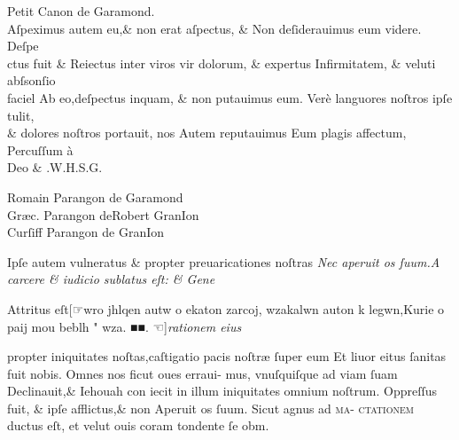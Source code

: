 \documentclass{article}
\newcommand{\threecolumntypefacenames}[3]{\begin{multicols}{3}
		\tiny
		\hfill \qquad \qquad \qquad \qquad #1\hspace*{\fill}\\
		\columnbreak
		\hfill #2\hspace*{\fill}\\
		\columnbreak
		\hfill #3\qquad \qquad \qquad \qquad \hspace*{\fill}
\end{multicols}}
\newcommand{\greektext}{\grecs wro jhlqen autw o ekaton zarcoj, wzakalwn auton k legwn,Kurie o paij mou beblh "\normalfont}
\begin{document}
{\small
\centering
Petit Canon de Garamond.\\
\vspace{-0.5\baselineskip}
\Large
\justifying
Aſpeximus autem eu,\& non erat aſpectus, \& Non deſiderauimus eum videre. Deſpe \\
ctus fuit \& Reiectus inter viros vir dolorum, \& expertus Infirmitatem, \& veluti abſsonſio \\
faciel Ab eo,deſpectus inquam, \& non putauimus eum. Ver\`e languores noſtros ipſe tulit, \\
\& dolores noſtros portauit, nos Autem reputauimus Eum plagis affectum, Percuſſum \`a\\
\centering
Deo \& .\quad  W.\quad H.\quad S.\quad G.\quad \\
\vspace{-\baselineskip}
\threecolumntypefacenames{Romain Parangon de Garamond}{Gr\ae{}c. Parangon deRobert GranIon\quad \quad \quad \quad \quad \quad \quad \quad }{Curſiff Parangon de GranIon}
\vspace*{-\baselineskip}
\scriptsize
\begin{multicols}{2}
	\justifying
	\normalsize
	\justifying
	Ipſe autem vulneratus \& propter preuaricationes noſtras\linebreak
	\columnbreak
	\textit{Nec aperuit os ſuum.A carcere \& iudicio sublatus eſt: \& Gene}
\end{multicols}
\vspace{-1.55\baselineskip}
\normalsize
\justifying
\noindent
Attritus eſt\hfill[\hfill☞\hfill \greektext \grecs{}  wza. ■■. \normalfont%
	\hfill ☜\hfill ]\hfill \textit{rationem eius}
\vspace{-1.05\baselineskip}
\begin{multicols}{2}
	\noindent propter iniquitates noſtas,caſtigatio pacis noſtr\ae{} ſuper eum\linebreak
	Et liuor eitus ſanitas fuit nobis. Omnes nos ficut oues erraui-\linebreak
	mus, vnuſquiſque ad viam ſuam Declinauit,\& Iehouah con\linebreak
	iecit in illum iniquitates omnium noſtrum. Oppreſſus fuit,\linebreak
	\& ipſe afflictus,\& non Aperuit os ſuum. Sicut agnus ad \textsc{ma}-\linebreak
	\textsc{ctationem} ductus eſt, et velut ouis coram tondente ſe obm.\\


\end{multicols}}
\end{document}
